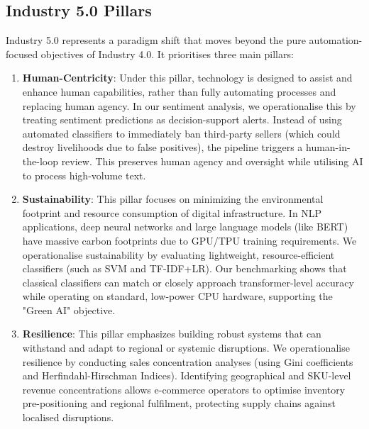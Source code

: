 \documentclass[11pt]{article}
\begin{document}
\subsection{Industry 5.0 Pillars}
Industry 5.0 represents a paradigm shift that moves beyond the pure automation-focused objectives of Industry 4.0. It prioritises three main pillars:
\begin{enumerate}
    \item \textbf{Human-Centricity}: Under this pillar, technology is designed to assist and enhance human capabilities, rather than fully automating processes and replacing human agency. In our sentiment analysis, we operationalise this by treating sentiment predictions as decision-support alerts. Instead of using automated classifiers to immediately ban third-party sellers (which could destroy livelihoods due to false positives), the pipeline triggers a human-in-the-loop review. This preserves human agency and oversight while utilising AI to process high-volume text.
    \item \textbf{Sustainability}: This pillar focuses on minimizing the environmental footprint and resource consumption of digital infrastructure. In NLP applications, deep neural networks and large language models (like BERT) have massive carbon footprints due to GPU/TPU training requirements. We operationalise sustainability by evaluating lightweight, resource-efficient classifiers (such as SVM and TF-IDF+LR). Our benchmarking shows that classical classifiers can match or closely approach transformer-level accuracy while operating on standard, low-power CPU hardware, supporting the "Green AI" objective.
    \item \textbf{Resilience}: This pillar emphasizes building robust systems that can withstand and adapt to regional or systemic disruptions. We operationalise resilience by conducting sales concentration analyses (using Gini coefficients and Herfindahl-Hirschman Indices). Identifying geographical and SKU-level revenue concentrations allows e-commerce operators to optimise inventory pre-positioning and regional fulfilment, protecting supply chains against localised disruptions.
\end{enumerate}
\end{document}
